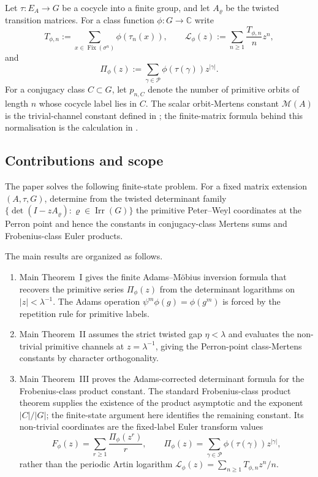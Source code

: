 \documentclass[11pt,a4paper]{amsart}
\theoremstyle{plain}
\theoremstyle{definition}
\theoremstyle{remark}
\DeclareMathOperator{\Irr}{Irr}
\newcommand{\CC}{\mathbb{C}}
\newcommand{\cP}{\mathcal P}
\begin{document}
Let \(\tau:E_A\to G\) be a cocycle into a finite group, and let
\(A_\varrho\) be the twisted transition matrices. For a class function
\(\phi:G\to\CC\) write
\[
  T_{\phi,n}:=\sum_{x\in\operatorname{Fix}(\sigma^n)}
    \phi(\tau_n(x)),
  \qquad
  \mathcal L_\phi(z):=\sum_{n\ge 1}\frac{T_{\phi,n}}{n}z^n,
\]
and
\[
  \Pi_\phi(z):=\sum_{\gamma\in\cP}\phi(\tau(\gamma))z^{|\gamma|}.
\]
For a conjugacy class \(C\subset G\), let \(p_{n,C}\) denote the number
of primitive orbits of length \(n\) whose cocycle label lies in \(C\).
The scalar orbit-Mertens constant \(\mathcal M(A)\) is the
trivial-channel constant defined in ; the
  finite-matrix formula behind this normalisation is the calculation in
  .

\subsection{Contributions and scope}\label{sec:intro-scope-of-results}

The paper solves the following finite-state problem.  For a fixed matrix
extension \((A,\tau,G)\), determine from the twisted determinant family
\(\{\det(I-zA_\varrho):\varrho\in\Irr(G)\}\) the primitive
Peter--Weyl coordinates at the Perron point and hence the constants in
conjugacy-class Mertens sums and Frobenius-class Euler products.

The main results are organized as follows.
\begin{enumerate}[label=\textup{(\roman*)},leftmargin=*]
  \item Main Theorem~I gives the finite Adams--M\"obius inversion formula
  that recovers the primitive series \(\Pi_\phi(z)\) from the determinant
  logarithms on \(|z|<\lambda^{-1}\).  The Adams operation
  \(\psi^m\phi(g)=\phi(g^m)\) is forced by the repetition rule for primitive
  labels.
  \item Main Theorem~II assumes the strict twisted gap \(\eta<\lambda\) and
  evaluates the non-trivial primitive channels at \(z=\lambda^{-1}\), giving
  the Perron-point class-Mertens constants by character orthogonality.
  \item Main Theorem~III proves the Adams-corrected determinant formula for the
  Frobenius-class product constant.  The standard Frobenius-class product
  theorem supplies the existence of the product asymptotic and the exponent
  \(|C|/|G|\); the finite-state argument here identifies the remaining
  constant.  Its non-trivial coordinates are the fixed-label Euler
  transform values
  \[
    F_\phi(z)=\sum_{r\ge1}\frac{\Pi_\phi(z^r)}{r},
    \qquad
    \Pi_\phi(z)=\sum_{\gamma\in\mathcal P}
         \phi(\tau(\gamma))z^{|\gamma|},
  \]
  rather than the periodic Artin logarithm
  \(\mathcal L_\phi(z)=\sum_{n\ge1}T_{\phi,n}z^n/n\).
\end{enumerate}
\end{document}
